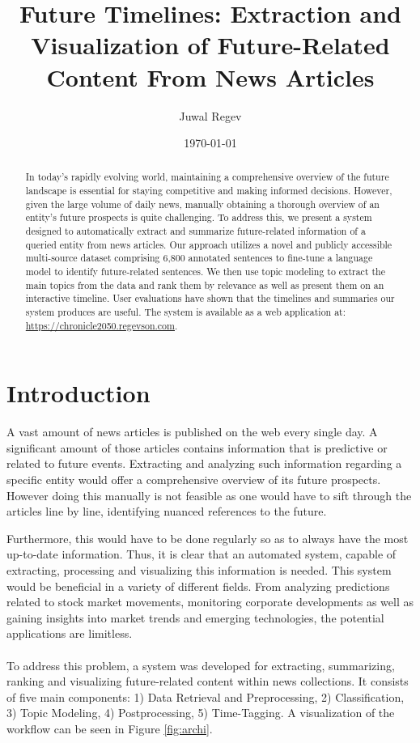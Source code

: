 \documentclass[a4paper,10pt]{report}
\title{Future Timelines: Extraction and Visualization of Future-Related Content From News Articles}
\author{Juwal Regev}
\date{\today} %
\begin{document}
\maketitle

\begin{abstract}
In today's rapidly evolving world, maintaining a comprehensive overview of the future landscape is essential for staying competitive and making informed decisions. However, given the large volume of daily news, manually obtaining a thorough overview of an entity's future prospects is quite challenging. To address this, we present a system designed to automatically extract and summarize future-related information of a queried entity from news articles. Our approach utilizes a novel and publicly accessible multi-source dataset comprising 6,800 annotated sentences to fine-tune a language model to identify future-related sentences. We then use topic modeling to extract the main topics from the data and rank them by relevance as well as present them on an interactive timeline. User evaluations have shown that the timelines and summaries our system produces are useful. The system is available as a web application at: \url{https://chronicle2050.regevson.com}.
\end{abstract}

\tableofcontents
\listoffigures
\listoftables

\chapter{Introduction}
A vast amount of news articles is published on the web every single day. A significant amount of those articles contains information that is predictive or related to future events. Extracting and analyzing such information regarding a specific entity would offer a comprehensive overview of its future prospects. However doing this manually is not feasible as one would have to sift through the articles line by line, identifying nuanced references to the future.

Furthermore, this would have to be done regularly so as to always have the most up-to-date information. Thus, it is clear that an automated system, capable of extracting, processing and visualizing this information is needed. This system would be beneficial in a variety of different fields. From analyzing predictions related to stock market movements, monitoring corporate developments as well as gaining insights into market trends and emerging technologies, the potential applications are limitless. 
\\\\
To address this problem, a system was developed for extracting, summarizing, ranking and visualizing future-related content within news collections. It consists of five main components: 1) Data Retrieval and Preprocessing, 2) Classification, 3) Topic Modeling, 4) Postprocessing, 5) Time-Tagging. A visualization of the workflow can be seen in Figure \ref{fig:archi}.
\end{document}
